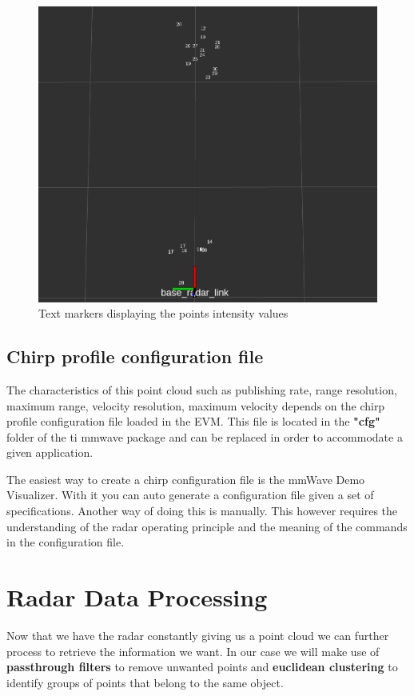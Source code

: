 \documentclass[12pt]{article}
\begin{document}
\begin{figure}[!htb]
    \centering
    \includegraphics[scale=0.25]{intensity_marker.png}
    \caption{Text markers displaying the points intensity values}
    \label{fig:intensity_marker}
\end{figure}
\subsection{Chirp profile configuration file}
The characteristics of this point cloud such as publishing rate, range resolution, maximum range, velocity resolution, maximum velocity depends on the chirp profile configuration file loaded in the EVM. This file is located in the \textbf{"cfg"} folder of the ti mmwave package and can be replaced in order to accommodate a given application.

The easiest way to create a chirp configuration file is the mmWave Demo Visualizer. With it you can auto generate a configuration file given a set of specifications.
Another way of doing this is manually. This however requires the understanding of the radar operating principle and the meaning of the commands in the configuration file.

\section{Radar Data Processing}
Now that we have the radar constantly giving us a point cloud we can further process to retrieve the information we want. 
In our case we will make use of \textbf{passthrough filters} to remove unwanted points and \textbf{euclidean clustering} to identify groups of points that belong to the same object.
\end{document}
